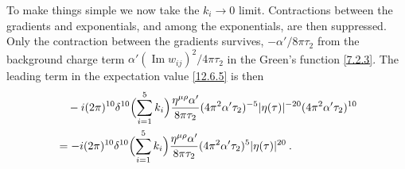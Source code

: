 To make things simple we now take the $k_i \to 0$ limit. Contractions between the gradients and exponentials, and among the exponentials, are then suppressed. Only the contraction between the gradients survives, $-\alpha'/8\pi\tau_2$ from the background charge term $\alpha'(\operatorname{Im} w_{ij})^2/4\pi\tau_2$ in the Green's function \eqref{7.2.3}. The leading term in the expectation value \eqref{12.6.5} is then
\begin{align}
	&\quad -i(2\pi)^{10}\delta^{10}\Bigl(\sum_{i=1}^{5}k_i\Bigr)\frac{\eta^{\mu\rho}\alpha'}{8\pi\tau_2}(4\pi^2\alpha'\tau_2)^{-5}|\eta(\tau)|^{-20}(4\pi^2\alpha'\tau_2)^{10} \nonumber \\
	&= -i(2\pi)^{10}\delta^{10}\Bigl(\sum_{i=1}^{5}k_i\Bigr)\frac{\eta^{\mu\rho}\alpha'}{8\pi\tau_2}(4\pi^2\alpha'\tau_2)^5 |\eta(\tau)|^{20} \:. \label{12.6.6}
\end{align}

